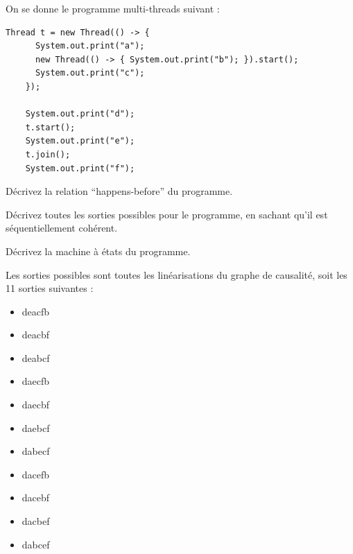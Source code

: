 
\begingroup

\begin{exercice}[Asynchronie]
  \label{exo:introduction/asynchronous}

  On se donne le programme multi-threads suivant : 

  \begin{lstlisting}[gobble=0]
    Thread t = new Thread(() -> {
      System.out.print("a");
      new Thread(() -> { System.out.print("b"); }).start();
      System.out.print("c");
    });

    System.out.print("d");
    t.start();
    System.out.print("e");
    t.join();
    System.out.print("f");
  \end{lstlisting}

  \begin{questions}
  \item Décrivez la relation ``happens-before'' du programme.
  \item Décrivez toutes les sorties possibles pour le programme, en sachant qu'il est séquentiellement cohérent.
  \item Décrivez la machine à états du programme.
  \end{questions}

  \begin{corrections}
    Les sorties possibles sont toutes les linéarisations du graphe de causalité, soit les 11 sorties suivantes :
    
    \begin{minipage}{.4\textwidth}
    \end{minipage}
    \begin{minipage}{.4\textwidth}
      \begin{itemize}
      \item deacfb
      \item deacbf
      \item deabcf
      \item daecfb
      \item daecbf
      \item daebcf
      \item dabecf
      \item dacefb
      \item dacebf
      \item dacbef
      \item dabcef
      \end{itemize}
    \end{minipage}
  \end{corrections}
  
\end{exercice}

\endgroup
\endinput
